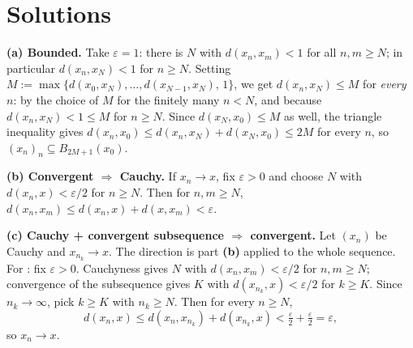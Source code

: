 
\section{Solutions}
\label{sec:completeness_solutions}

\begin{exercisesolution}
\label{sol:cauchy_elementary_facts}
\textbf{(a) Bounded.} Take $\varepsilon=1$: there is $N$ with $d(x_n,x_m)<1$ for all
$n,m\geq N$; in particular $d(x_n,x_N)<1$ for $n\geq N$. Setting
$M := \max\{d(x_0,x_N),\dots,d(x_{N-1},x_N),\,1\}$, we get $d(x_n,x_N) \leq M$ for \emph{every}
$n$: by the choice of $M$ for the finitely many $n < N$, and because $d(x_n,x_N) < 1 \leq M$ for
$n \geq N$. Since $d(x_N,x_0) \leq M$ as well, the triangle inequality gives
$d(x_n,x_0) \leq d(x_n,x_N)+d(x_N,x_0) \leq 2M$ for every $n$, so $(x_n)_n \subseteq B_{2M+1}(x_0)$.

\textbf{(b) Convergent $\Rightarrow$ Cauchy.} If $x_n \to x$, fix $\varepsilon>0$ and choose $N$
with $d(x_n,x)<\varepsilon/2$ for $n\geq N$. Then for $n,m\geq N$,
$d(x_n,x_m) \leq d(x_n,x)+d(x,x_m) < \varepsilon$.

\textbf{(c) Cauchy + convergent subsequence $\Rightarrow$ convergent.} Let $(x_n)$ be Cauchy and
$x_{n_k} \to x$. The  direction is part \textbf{(b)} applied to the whole sequence.
For : fix $\varepsilon>0$. Cauchyness gives $N$ with $d(x_n,x_m)<\varepsilon/2$ for
$n,m\geq N$; convergence of the subsequence gives $K$ with $d(x_{n_k},x)<\varepsilon/2$ for
$k\geq K$. Since $n_k \to \infty$, pick $k\geq K$ with $n_k \geq N$. Then for every $n\geq N$,
\[d(x_n,x) \leq d(x_n,x_{n_k}) + d(x_{n_k},x) < \tfrac{\varepsilon}{2}+\tfrac{\varepsilon}{2} = \varepsilon,\]
so $x_n \to x$.
\end{exercisesolution}

